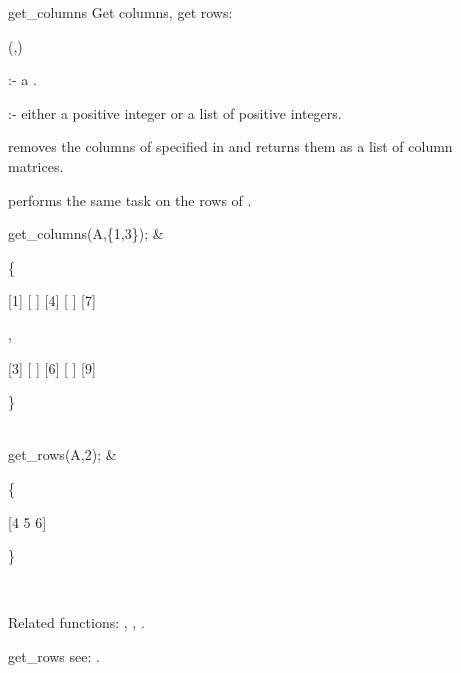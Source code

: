 \begin{Operator}{get_columns}
Get columns, get rows:

\begin{Syntax}
(,)
\end{Syntax}

 :- a .

      :- either a positive integer or a list of positive 
                 integers.

 removes the columns of  specified in 
 and returns them as a list of column matrices. 

 performs the same task on the rows of . 

\begin{Examples}

get_columns(A,\{1,3\}); & 
\begin{multilineoutput}{6cm}
\{

 [1]
 [ ]
 [4]
 [ ]
 [7]

 ,

 [3]
 [ ]
 [6]
 [ ]
 [9]

\}
\end{multilineoutput} \\

get_rows(A,2); &
\begin{multilineoutput}{6cm}
\{

 [4  5  6]

\}
\end{multilineoutput} \\

\end{Examples}

Related functions:
, , .

\end{Operator}


\begin{Operator}{get_rows}
see:  .
\end{Operator}


